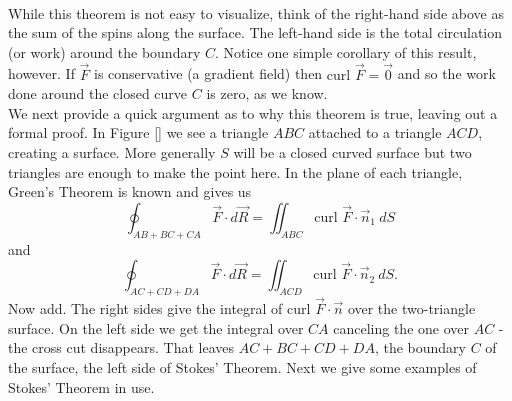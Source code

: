 \\

While this theorem is not easy to visualize, think of the right-hand side above as the sum of the spins along the surface.  The left-hand side is the total circulation (or work) around the boundary $C$.  Notice one simple corollary of this result, however.  If $\vec F$ is conservative (a gradient field) then $\text{curl } \vec F = \vec 0$ and so the work done around the closed curve $C$ is zero, as we know.\\

We next provide a quick argument as to why this theorem is true, leaving out a formal proof.  In Figure \ref{} we see a triangle $ABC$ attached to a triangle $ACD$, creating a surface.  More generally $S$ will be a closed curved surface but two triangles are enough to make the point here.  In the plane of each triangle, Green's Theorem is known and gives us
$$\oint_{AB+BC+CA} \vec F \cdot d\vec R = \iint_{ABC} \text{curl } \vec F \cdot \vec n_1 \: dS$$
and
$$\oint_{AC+CD+DA} \vec F \cdot d\vec R = \iint_{ACD} \text{curl } \vec F \cdot \vec n_2 \: dS.$$
Now add.  The right sides give the integral of $\text{curl } \vec F \cdot \vec n$ over the two-triangle surface.  On the left side we get the integral over $CA$ canceling the one over $AC$ - the cross cut disappears.  That leaves $AC + BC + CD + DA$, the boundary $C$ of the surface, the left side of Stokes' Theorem. Next we give some examples of Stokes' Theorem in use.\\

\\


